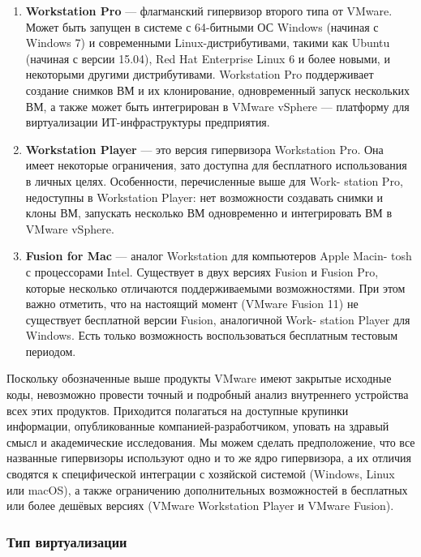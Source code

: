 \documentclass[14pt, a4paper]{article}
\begin{document}
\begin{enumerate}
    \item \textbf{Workstation Pro} — флагманский гипервизор второго типа от VMware. Может быть запущен в
    системе с 64-битными ОС Windows (начиная с Windows 7) и современными
    Linux-дистрибутивами, такими как Ubuntu (начиная с версии 15.04), Red Hat Enterprise Linux 6 и
    более новыми, и некоторыми другими дистрибутивами. Workstation Pro поддерживает
    создание снимков ВМ и их клонирование, одновременный запуск нескольких ВМ, а также
    может быть интегрирован в VMware vSphere — платформу для виртуализации
    ИТ-инфраструктуры предприятия.
    \item \textbf{Workstation Player} — это версия гипервизора Workstation Pro. Она имеет некоторые
    ограничения, зато доступна для бесплатного использования в личных целях. Особенности,
    перечисленные выше для Work- station Pro, недоступны в Workstation Player: нет возможности
    создавать снимки и клоны ВМ, запускать несколько ВМ одновременно и интегрировать ВМ в
    VMware vSphere.
    \item \textbf{Fusion for Mac} — аналог Workstation для компьютеров Apple Macin- tosh с процессорами Intel.
    Существует в двух версиях Fusion и Fusion Pro, которые несколько отличаются
    поддерживаемыми возможностями. При этом важно отметить, что на настоящий момент
    (VMware Fusion 11) не существует бесплатной версии Fusion, аналогичной Work- station Player
    для Windows. Есть только возможность воспользоваться бесплатным тестовым периодом.
\end{enumerate}

Поскольку обозначенные выше продукты VMware имеют закрытые исходные коды, невозможно
провести точный и подробный анализ внутреннего устройства всех этих продуктов. Приходится
полагаться на доступные крупинки информации, опубликованные компанией-разработчиком, уповать
на здравый смысл и академические исследования. Мы можем сделать предположение, что все
названные гипервизоры используют одно и то же ядро гипервизора, а их отличия сводятся к
специфической интеграции с хозяйской системой (Windows, Linux или macOS), а также ограничению
дополнительных возможностей в бесплатных или более дешёвых версиях (VMware Workstation Player
и VMware Fusion).

\subsubsection*{Тип виртуализации}
\end{document}
